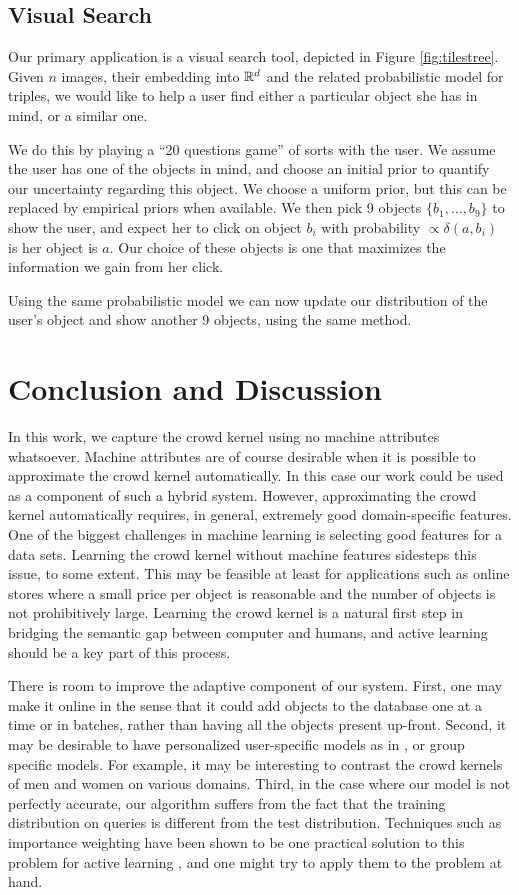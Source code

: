 \documentclass{article}
\begin{document}
\subsection{Visual Search}
Our primary application is a visual search tool, depicted in Figure
\ref{fig:tilestree}. Given $n$ images, their embedding into $\mathbb{R}^d$
and the related probabilistic model for triples, we would like to help
a user find either a particular object she has in mind, or a similar
one.

We do this by playing a ``20 questions game'' of sorts with the
user. We assume the user has one of the objects in mind, and choose an
initial prior to quantify our uncertainty regarding this object. We
choose a uniform prior, but this can be replaced by empirical priors
when available. We then pick 9 objects $\{b_1,\ldots,b_9\}$ to show the
user, and expect her to click on object $b_i$ with probability
$\propto \delta(a, b_i)$ is her object is $a$. Our choice of these
objects is one that maximizes the information we gain from her click.

Using the same probabilistic model we can now update our distribution
of the user's object and show another 9 objects, using the same method.

\section{Conclusion and Discussion}
In this work, we capture the crowd kernel using no machine attributes
whatsoever.  Machine attributes are of course desirable when it is
possible to approximate the crowd kernel automatically. In this case
our work could be used as a component of such a hybrid
system. However, approximating the crowd kernel automatically
requires, in general, extremely good domain-specific features.  One of
the biggest challenges in machine learning is selecting good features
for a data sets.  Learning the crowd kernel without machine features
sidesteps this issue, to some extent.  This may be feasible at least
for applications such as online stores where a small price per object
is reasonable and the number of objects is not prohibitively large.
Learning the crowd kernel is a natural first step in bridging the
semantic gap between computer and humans, and active learning should
be a key part of this process.

There is room to improve the adaptive component of our system.  First,
one may make it online in the sense that it could add objects to the
database one at a time or in batches, rather than having all the
objects present up-front.  Second, it may be desirable to have
personalized user-specific models as in \cite{??}, or group specific
models.  For example, it may be interesting to contrast the crowd
kernels of men and women on various domains.  Third, in the case where
our model is not perfectly accurate, our algorithm suffers from the
fact that the training distribution on queries is different from the
test distribution.  Techniques such as importance weighting have been
shown to be one practical solution to this problem for active learning
\cite{BDL09}, and one might try to apply them to the problem at hand.



\end{document}
